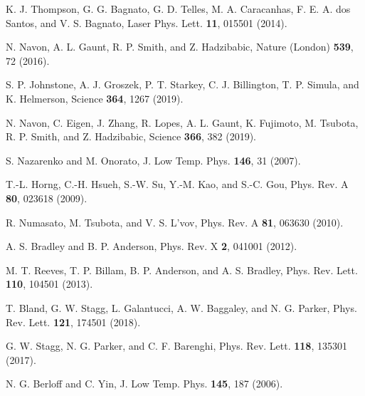 \documentclass[pra,aps,superscriptaddress,twocolumn]{revtex4-2}
\begin{document}
\begin{thebibliography}{99}
K. J. Thompson, G. G. Bagnato, G. D. Telles, M. A. Caracanhas, F. E. A. dos
Santos, and V. S. Bagnato,
Laser Phys. Lett. \textbf{11}, 015501 (2014).

N. Navon, A. L. Gaunt, R. P. Smith, and Z. Hadzibabic,
Nature (London) \textbf{539}, 72 (2016).

S. P. Johnstone, A. J. Groszek, P. T. Starkey, C. J. Billington,
T. P. Simula, and K. Helmerson,
Science \textbf{364}, 1267 (2019).

N. Navon, C. Eigen, J. Zhang, R. Lopes, A. L. Gaunt, K. Fujimoto,
M. Tsubota, R. P. Smith, and Z. Hadzibabic,
Science \textbf{366}, 382 (2019).

S. Nazarenko and M. Onorato,
J. Low Temp. Phys. \textbf{146}, 31 (2007).

T.-L. Horng, C.-H. Hsueh, S.-W. Su, Y.-M. Kao, and S.-C. Gou,
Phys. Rev. A \textbf{80}, 023618 (2009).

R. Numasato, M. Tsubota, and V. S. L'vov,
Phys. Rev. A \textbf{81}, 063630 (2010).

A. S. Bradley and B. P. Anderson,
Phys. Rev. X \textbf{2}, 041001 (2012).

M. T. Reeves, T. P. Billam, B. P. Anderson, and A. S. Bradley,
Phys. Rev. Lett. \textbf{110}, 104501 (2013).

T. Bland, G. W. Stagg, L. Galantucci, A. W. Baggaley, and N. G. Parker,
Phys. Rev. Lett. \textbf{121}, 174501 (2018).

G. W. Stagg, N. G. Parker, and C. F. Barenghi,
Phys. Rev. Lett. \textbf{118}, 135301 (2017).

N. G. Berloff and C. Yin,
J. Low Temp. Phys. \textbf{145}, 187 (2006).


\end{thebibliography}
\end{document}
